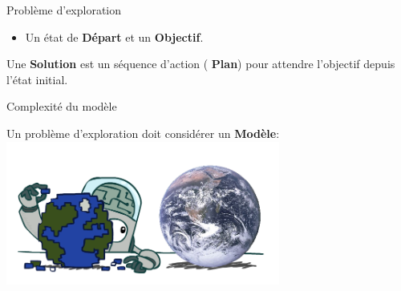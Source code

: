 \documentclass{beamer}
\begin{document}
\begin{frame}[t]{Problème d'exploration}
\begin{itemize}
  \pause
\pause
\item Un état de \textbf{Départ}  et  un \textbf{\alert{Objectif}}.
\end{itemize}
\pause
Une \textbf{Solution} est un séquence d'action ( \textbf{\alert{Plan}}) pour
attendre l'objectif depuis l'état initial. 
\end{frame}


\begin{frame}[t]{Complexité du modèle}
  
  \centering
  Un problème d'exploration doit considérer un \textbf{\alert{Modèle}}:
  \includegraphics[width=9cm,height=0.6\textheight]{./images/exploration_model.png}
\end{frame}
\end{document}
